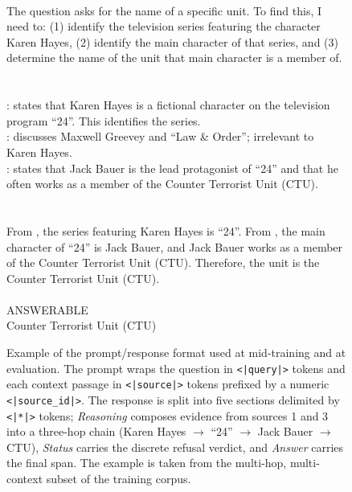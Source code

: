 \begin{figure}[htbp]
\begin{tcolorbox}[
    colback=gray!5!white,
    colframe=gray!75!black,
    title=Response,
    fonttitle=\bfseries,
    breakable,
    enhanced,
    fontupper=\ttfamily\footnotesize,
]
\\
The question asks for the name of a specific unit. To find this, I need to: (1) identify the television series featuring the character Karen Hayes, (2) identify the main character of that series, and (3) determine the name of the unit that main character is a member of.\\
\\[2pt]
\\
: states that Karen Hayes is a fictional character on the television program ``24''. This identifies the series.\\
: discusses Maxwell Greevey and ``Law \& Order''; irrelevant to Karen Hayes.\\
: states that Jack Bauer is the lead protagonist of ``24'' and that he often works as a member of the Counter Terrorist Unit (CTU).\\
\\[2pt]
\\
From , the series featuring Karen Hayes is ``24''. From , the main character of ``24'' is Jack Bauer, and Jack Bauer works as a member of the Counter Terrorist Unit (CTU). Therefore, the unit is the Counter Terrorist Unit (CTU).\\
\\[2pt]
 ANSWERABLE \\[2pt]
 Counter Terrorist Unit (CTU) 
\end{tcolorbox}
\caption{Example of the prompt/response format used at mid-training and at evaluation. The prompt wraps the question in {\color{ptokcolor}\texttt{<|query|>}} tokens and each context passage in {\color{ptokcolor}\texttt{<|source|>}} tokens prefixed by a numeric {\color{srccolor}\texttt{<|source\_id|>}}. The response is split into five sections delimited by {\color{rtokcolor}\texttt{<|*|>}} tokens; \emph{Reasoning} composes evidence from sources 1 and 3 into a three-hop chain (Karen Hayes $\rightarrow$ ``24'' $\rightarrow$ Jack Bauer $\rightarrow$ CTU), \emph{Status} carries the discrete refusal verdict, and \emph{Answer} carries the final span. The example is taken from the multi-hop, multi-context subset of the training corpus.}
\label{fig:trace-training-example}
\end{figure}
